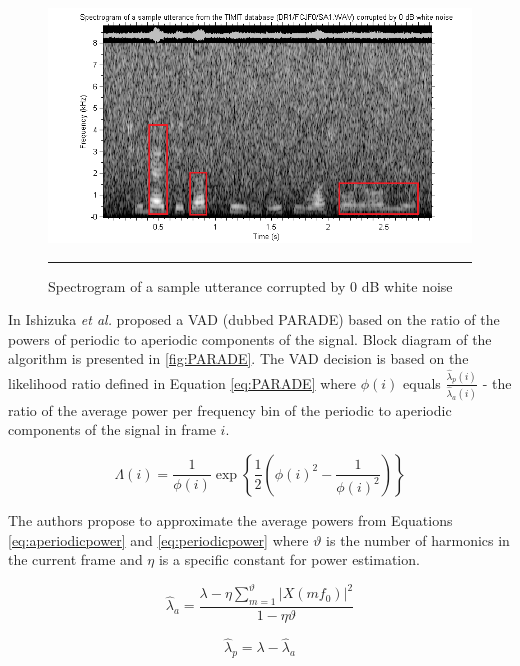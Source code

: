\begin{figure}[htbp]
	\centering
		\includegraphics[width=0.9\columnwidth]{Figures/harmospgramwhite.png}
		\rule{37em}{0.5pt}
	\caption[Spectrogram of a sample utterance corrupted by 0 dB white noise]{Spectrogram of a sample utterance corrupted by 0 dB white noise}
	\label{fig:harmospgramwhite}
\end{figure}

In \cite{PARADE} Ishizuka \emph{et al.} proposed a VAD (dubbed PARADE) based on the ratio of the powers of periodic to aperiodic components of the signal. Block diagram of the algorithm is presented in \ref{fig:PARADE}. The VAD decision is based on the likelihood ratio defined in Equation \ref{eq:PARADE} where $\phi (i)$ equals $\frac{\hat{\lambda}_p (i)}{\hat{\lambda}_a (i)}$ - the ratio of the average power per frequency bin of the periodic to aperiodic components of the signal in frame $i$.

\begin{equation}
\Lambda(i) = \frac{1}{\phi (i)} \exp \left\{ \frac{1}{2} \left( \phi (i)^{2} - \frac{1}{\phi (i)^{2}} \right) \right\}
\label{eq:PARADE}
\end{equation}

The authors propose to approximate the average powers from Equations \ref{eq:aperiodicpower} and \ref{eq:periodicpower} where $\vartheta$ is the number of harmonics in the current frame and $\eta$ is a specific constant for power estimation.

\begin{equation}
\hat{\lambda}_a = \frac{\lambda - \eta \sum_{m=1}^{\vartheta} \left| X(m f_0) \right|^{2}}{1-\eta \vartheta}
\label{eq:aperiodicpower}
\end{equation}

\begin{equation}
\hat{\lambda}_p = \lambda - \hat{\lambda}_a
\label{eq:periodicpower}
\end{equation}

